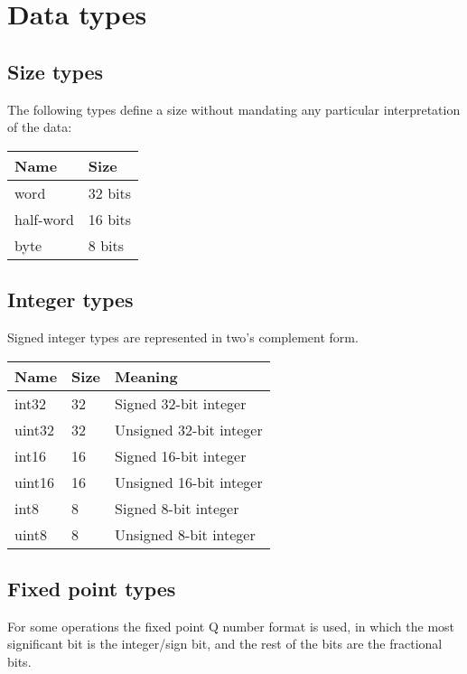 \section{Data types}

\subsection{Size types}

The following types define a size without mandating any particular
interpretation of the data:

\begin{tabular}{|l|l|}
  \hline
  \textbf{Name} & \textbf{Size} \\
  \hline
  word & 32 bits \\
  \hline
  half-word & 16 bits \\
  \hline
  byte & 8 bits \\
  \hline
\end{tabular}

\subsection{Integer types}

Signed integer types are represented in two's complement form.

\begin{tabular}{|l|l|p{140pt}|}
  \hline
  \textbf{Name} & \textbf{Size} & \textbf{Meaning} \\
  \hline
  int32 & 32 & Signed 32-bit integer \\
  \hline
  uint32 & 32 & Unsigned 32-bit integer \\
  \hline
  int16 & 16 & Signed 16-bit integer \\
  \hline
  uint16 & 16 & Unsigned 16-bit integer \\
  \hline
  int8 & 8 & Signed 8-bit integer \\
  \hline
  uint8 & 8 & Unsigned 8-bit integer \\
  \hline
\end{tabular}

\subsection{Fixed point types}

For some operations the fixed point Q number format is used, in which the most
significant bit is the integer/sign bit, and the rest of the bits are the
fractional bits.

